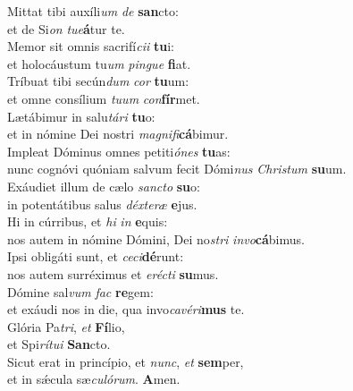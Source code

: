 \evenverse Mittat tibi auxíli\textit{um} \textit{de} \textbf{san}cto:~\*\\
\evenverse et de Si\textit{on} \textit{tu}\textit{e}\textbf{á}tur te.\\
\oddverse Memor sit omnis sacrifí\textit{ci}\textit{i} \textbf{tu}i:~\*\\
\oddverse et holocáustum tu\textit{um} \textit{pin}\textit{gue} \textbf{fi}at.\\
\evenverse Tríbuat tibi secún\textit{dum} \textit{cor} \textbf{tu}um:~\*\\
\evenverse et omne consílium \textit{tu}\textit{um} \textit{con}\textbf{fír}met.\\
\oddverse Lætábimur in salu\textit{tá}\textit{ri} \textbf{tu}o:~\*\\
\oddverse et in nómine Dei nostri \textit{ma}\textit{gni}\textit{fi}\textbf{cá}bimur.\\
\evenverse Impleat Dóminus omnes petiti\textit{ó}\textit{nes} \textbf{tu}as:~\*\\
\evenverse nunc cognóvi quóniam salvum fecit Dómi\textit{nus} \textit{Chri}\textit{stum} \textbf{su}um.\\
\oddverse Exáudiet illum de cælo \textit{san}\textit{cto} \textbf{su}o:~\*\\
\oddverse in potentátibus salus \textit{déx}\textit{te}\textit{ræ} \textbf{e}jus.\\
\evenverse Hi in cúrribus, et \textit{hi} \textit{in} \textbf{e}quis:~\*\\
\evenverse nos autem in nómine Dómini, Dei no\textit{stri} \textit{in}\textit{vo}\textbf{cá}bimus.\\
\oddverse Ipsi obligáti sunt, et \textit{ce}\textit{ci}\textbf{dé}runt:~\*\\
\oddverse nos autem surréximus et \textit{e}\textit{ré}\textit{cti} \textbf{su}mus.\\
\evenverse Dómine sal\textit{vum} \textit{fac} \textbf{re}gem:~\*\\
\evenverse et exáudi nos in die, qua invo\textit{ca}\textit{vé}\textit{ri}\textbf{mus} te.\\
\oddverse Glória Pa\textit{tri}, \textit{et} \textbf{Fí}lio,~\*\\
\oddverse et Spi\textit{rí}\textit{tu}\textit{i} \textbf{San}cto.\\
\evenverse Sicut erat in princípio, et \textit{nunc}, \textit{et} \textbf{sem}per,~\*\\
\evenverse et in sǽcula sæ\textit{cu}\textit{ló}\textit{rum}. \textbf{A}men.\\
